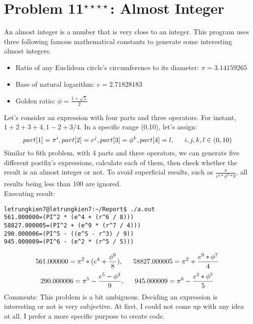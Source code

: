 \documentclass[11pt]{article}
\begin{document}
\section{Problem 11${}^{\star\star\star\star}$: \normalsize Almost Integer}
\indent An almost integer is a number that is very close to an integer. This program uses three following famous mathematical constants to generate some interesting almost integers. \\
\begin{itemize}
\item Ratio of any Euclidean circle's circumference to its diameter: $\pi=3.14159265$
\item Base of natural logarithm: $e=2.71828183$
\item Golden ratio: $\phi=\frac{1+\sqrt{5}}{2}$\\
\end{itemize}
\indent Let's consider an expression with four parts and three operators. For instant, $ 1+2+3+4, 1-2+3/4$. In a specific range (0,10), let's assign: 
\[part[1]=\pi^i, part[2]=e^j, part[3]=\phi^k, part[4]=l, \indent i,j,k,l \in (0,10)\]
\indent Similar to 6th problem, with 4 parts and three operators, we can generate five different postfix's expressions, calculate each of them, then check whether the result is an almost integer or not.
To avoid superficial results, such as $\frac{\pi}{e^9*\phi^9*9}$, all results being less than 100 are ignored. \\
Executing result:
\begin{verbatim}
letrungkien7@letrungkien7:~/Report$ ./a.out 
561.000000=(PI^2 * (e^4 + (r^6 / 8)))
58827.000005=(PI^2 + (e^9 * (r^7 / 4)))
290.000006=(PI^5 - ((e^5 - r^3) / 9))
945.000009=(PI^6 - (e^2 * (r^5 / 5)))
\end{verbatim}
\[561.000000=\pi^2 * (e^4 + \frac{\phi^6}{8}), \indent 58827.000005=\pi^2 + \frac{e^9*\phi^7}{4}\]
\[290.000006=\pi^5 - \frac{e^5-\phi^3}{9}, \indent 945.000009=\pi^6 - \frac{e^2 * \phi^5}{5}\]
\indent Comments: This problem is a bit ambiguous. Deciding an expression is interesting or not is very subjective. At first, I could not come up with any idea at all. I prefer a more specific purpose to create code.
\end{document}
